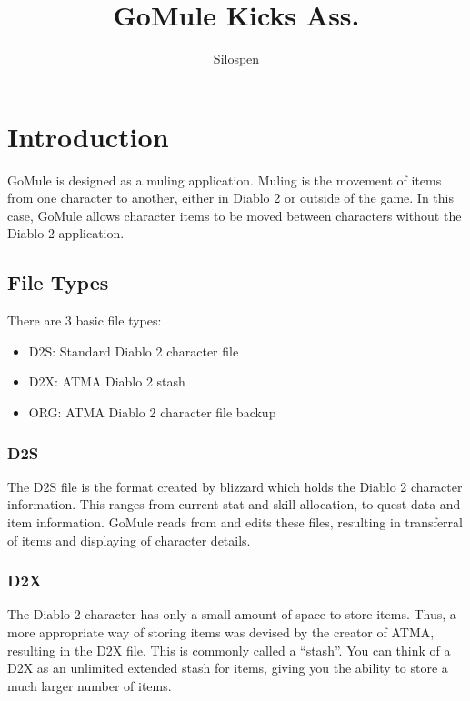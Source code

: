 \documentclass[a4paper,10pt]{article}
\title{GoMule Kicks Ass.}
\author{Silospen}
\begin{document}
\maketitle
\clearpage
\tableofcontents
\clearpage

\section{Introduction}

GoMule is designed as a muling application. Muling is the movement of items from one character to another, either in Diablo 2 or outside of the game. In this case, GoMule allows character items to be moved between characters without the Diablo 2 application.

\subsection{File Types}

There are 3 basic file types:

\begin{itemize}
 \item D2S: Standard Diablo 2 character file
 \item D2X: ATMA Diablo 2 stash
 \item ORG: ATMA Diablo 2 character file backup
\end{itemize}

\subsubsection{D2S}

The D2S file is the format created by blizzard which holds the Diablo 2 character information. This ranges from current stat and skill allocation, to quest data and item information. GoMule reads from and edits these files, resulting in transferral of items and displaying of character details.

\subsubsection{D2X}

The Diablo 2 character has only a small amount of space to store items. Thus, a more appropriate way of storing items was devised by the creator of ATMA, resulting in the D2X file. This is commonly called a ``stash''. You can think of a D2X as an unlimited extended stash for items, giving you the ability to store a much larger number of items.
\end{document}
